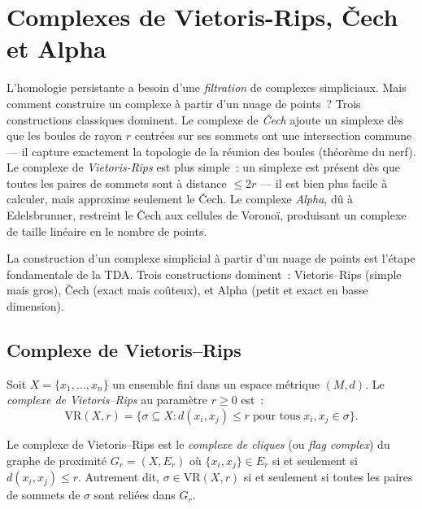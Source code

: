\chapter{Complexes de Vietoris-Rips, \v{C}ech et Alpha}
\label{ch:complexes}

L'homologie persistante a besoin d'une \emph{filtration} de complexes simpliciaux. Mais comment construire un complexe \`a partir d'un nuage de points~? Trois constructions classiques dominent. Le complexe de \emph{\v{C}ech} ajoute un simplexe d\`es que les boules de rayon $r$ centr\'ees sur ses sommets ont une intersection commune --- il capture exactement la topologie de la r\'eunion des boules (th\'eor\`eme du nerf). Le complexe de \emph{Vietoris-Rips} est plus simple~: un simplexe est pr\'esent d\`es que toutes les paires de sommets sont \`a distance $\leq 2r$ --- il est bien plus facile \`a calculer, mais approxime seulement le \v{C}ech. Le complexe \emph{Alpha}, d\^u \`a Edelsbrunner, restreint le \v{C}ech aux cellules de Vorono\"i, produisant un complexe de taille lin\'eaire en le nombre de points.

\begin{intuition}
La construction d'un complexe simplicial \`a partir d'un nuage de points
est l'\'etape fondamentale de la TDA. Trois constructions dominent~:
Vietoris--Rips (simple mais gros), \v{C}ech (exact mais co\^uteux),
et Alpha (petit et exact en basse dimension).
\end{intuition}

\section{Complexe de Vietoris--Rips}

\begin{definition}
Soit $X = \{x_1, \ldots, x_n\}$ un ensemble fini dans un espace
m\'etrique $(M, d)$. Le \emph{complexe de Vietoris--Rips} au
param\`etre $r \geq 0$ est~:
\[
  \mathrm{VR}(X, r) = \big\{
    \sigma \subseteq X : d(x_i, x_j) \leq r
    \;\text{pour tous}\; x_i, x_j \in \sigma
  \big\}.
\]
\end{definition}

\begin{remarque}
Le complexe de Vietoris--Rips est le \emph{complexe de cliques}
(ou \emph{flag complex}) du graphe de proximit\'e $G_r = (X, E_r)$
o\`u $\{x_i, x_j\} \in E_r$ si et seulement si $d(x_i, x_j) \leq r$.
Autrement dit, $\sigma \in \mathrm{VR}(X, r)$ si et seulement si toutes
les paires de sommets de $\sigma$ sont reli\'ees dans $G_r$.
\end{remarque}

